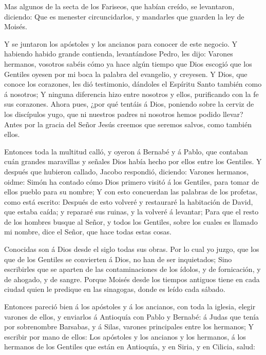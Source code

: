 Mas algunos de la secta de los Fariseos, que habían creído,
se levantaron, diciendo: Que es menester circuncidarlos, y mandarles que
guarden la ley de Moisés.

 Y se juntaron los apóstoles y los ancianos para conocer de
este negocio.  Y habiendo habido grande contienda,
levantándose Pedro, les dijo: Varones hermanos, vosotros sabéis cómo ya
hace algún tiempo que Dios escogió que los Gentiles oyesen por mi boca
la palabra del evangelio, y creyesen.  Y Dios, que conoce
los corazones, les dió testimonio, dándoles el Espíritu Santo también
como á nosotros;  Y ninguna diferencia hizo entre nosotros y
ellos, purificando con la fe sus corazones.  Ahora pues,
¿por qué tentáis á Dios, poniendo sobre la cerviz de los discípulos
yugo, que ni nuestros padres ni nosotros hemos podido llevar?
 Antes por la gracia del Señor Jesús creemos que seremos
salvos, como también ellos.

 Entonces toda la multitud calló, y oyeron á Bernabé y á
Pablo, que contaban cuán grandes maravillas y señales Dios había hecho
por ellos entre los Gentiles.  Y después que hubieron
callado, Jacobo respondió, diciendo: Varones hermanos, oidme:
 Simón ha contado cómo Dios primero visitó á los Gentiles,
para tomar de ellos pueblo para su nombre;  Y con esto
concuerdan las palabras de los profetas, como está escrito:
 Después de esto volveré y restauraré la habitación de
David, que estaba caída; y repararé sus ruinas, y la volveré á levantar;
 Para que el resto de los hombres busque al Señor, y todos
los Gentiles, sobre los cuales es llamado mi nombre, dice el Señor, que
hace todas estas cosas.

 Conocidas son á Dios desde el siglo todas sus obras.
 Por lo cual yo juzgo, que los que de los Gentiles se
convierten á Dios, no han de ser inquietados;  Sino
escribirles que se aparten de las contaminaciones de los ídolos, y de
fornicación, y de ahogado, y de sangre.  Porque Moisés
desde los tiempos antiguos tiene en cada ciudad quien le predique en las
sinagogas, donde es leído cada sábado.

 Entonces pareció bien á los apóstoles y á los ancianos,
con toda la iglesia, elegir varones de ellos, y enviarlos á Antioquía
con Pablo y Bernabé: á Judas que tenía por sobrenombre Barsabas, y á
Silas, varones principales entre los hermanos;  Y escribir
por mano de ellos: Los apóstoles y los ancianos y los hermanos, á los
hermanos de los Gentiles que están en Antioquía, y en Siria, y en
Cilicia, salud:

